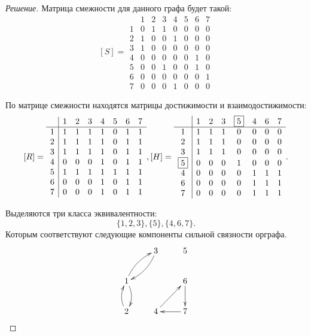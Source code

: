 \begin{proof}[Решение]
    Матрица смежности для данного графа будет такой:
    \[
        [S]=
        \begin{array}{c|ccccccc}
             &1&2&3&4&5&6&7\\ \hline
            1&0&1&1&0&0&0&0\\
            2&1&0&0&1&0&0&0\\
            3&1&0&0&0&0&0&0\\
            4&0&0&0&0&0&1&0\\
            5&0&0&1&0&0&1&0\\
            6&0&0&0&0&0&0&1\\
            7&0&0&0&1&0&0&0
        \end{array}
    \]
    
    По матрице смежности находятся матрицы достижимости и взаимодостижимости:
    \[
        [R]=
        \begin{array}{c|ccccccc}
             &1&2&3&4&5&6&7\\ \hline
            1&1&1&1&1&0&1&1\\
            2&1&1&1&1&0&1&1\\
            3&1&1&1&1&0&1&1\\
            4&0&0&0&1&0&1&1\\
            5&1&1&1&1&1&1&1\\
            6&0&0&0&1&0&1&1\\
            7&0&0&0&1&0&1&1
        \end{array},
        [H]=
        \begin{array}{c|ccccccc}
                 &1&2&3&\fbox{5}
                         &4&6&7\\ \hline
                1&1&1&1&0&0&0&0\\
                2&1&1&1&0&0&0&0\\
                3&1&1&1&0&0&0&0\\
         \fbox{5}&0&0&0&1&0&0&0\\
                4&0&0&0&0&1&1&1\\
                6&0&0&0&0&1&1&1\\
                7&0&0&0&0&1&1&1
        \end{array}.
    \]
    
    Выделяются три класса эквивалентности:
    \[
        \{1,2,3\},\{5\},\{4,6,7\}.
    \]
    Которым соответствуют следующие компоненты сильной связности орграфа.
    \[
        {\xymatrix{
            *{}
                &3 \ar@{->}@/^/[dl]
                    &5 
                        \\
            1 \ar@{->}@/^/[ur] \ar@{->}@/^/[d]
                &*{}
                    &6 \ar@{->}[d]
                        \\
            2 \ar@{->}@/^/[u]
                &4 \ar@{->}[ur]
                    &7 \ar@{->}[l]
        }}        
    \]
\end{proof}

